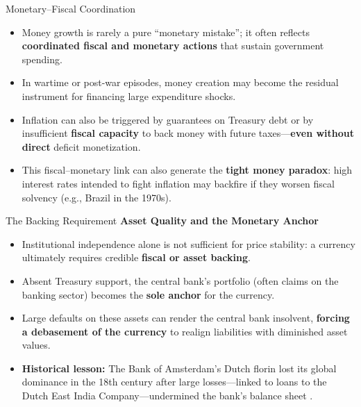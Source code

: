 \documentclass[11pt,aspectratio=169]{beamer}
\begin{document}
\begin{frame}{Monetary--Fiscal Coordination}
\small
\begin{itemize}
    \item Money growth is rarely a pure \enquote{monetary mistake}; it often reflects \textbf{coordinated fiscal and monetary actions} that sustain government spending.
    \item In wartime or post-war episodes, money creation may become the residual instrument for financing large expenditure shocks.
    \item Inflation can also be triggered by guarantees on Treasury debt or by insufficient \textbf{fiscal capacity} to back money with future taxes—\textbf{even without direct} deficit monetization.
    \item This fiscal--monetary link can also generate the \textbf{tight money paradox}: high interest rates intended to fight inflation may backfire if they worsen fiscal solvency (e.g., Brazil in the 1970s).
\end{itemize}
\end{frame}


\begin{frame}{The Backing Requirement}
\small
\textbf{Asset Quality and the Monetary Anchor}
\begin{itemize}
    \item Institutional independence alone is not sufficient for price stability: a currency ultimately requires credible \textbf{fiscal or asset backing}.
    \item Absent Treasury support, the central bank’s portfolio (often claims on the banking sector) becomes the \textbf{sole anchor} for the currency.
    \item Large defaults on these assets can render the central bank insolvent, \textbf{forcing a debasement of the currency} to realign liabilities with diminished asset values.
    \item \textbf{Historical lesson:} The Bank of Amsterdam’s Dutch florin lost its global dominance in the 18th century after large losses—linked to loans to the Dutch East India Company—undermined the bank’s balance sheet \parencite{quinn2014}.
\end{itemize}
\end{frame}

\end{document}
